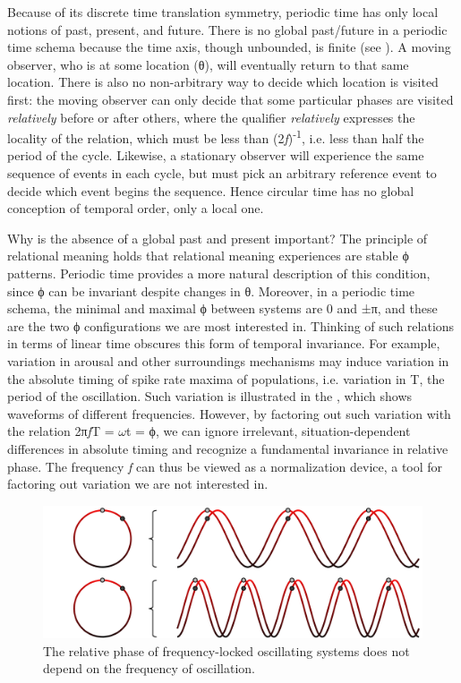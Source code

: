   Because of its discrete time translation symmetry, periodic time has only local notions of past, present, and future. There is no global past/future in a periodic time schema because the time axis, though unbounded, is finite (see {}). A moving observer, who is at some location (θ), will eventually return to that same location. There is also no non-arbitrary way to decide which location is visited first: the moving observer can only decide that some particular phases are visited \textit{relatively} before or after others, where the qualifier \textit{relatively} expresses the locality of the relation, which must be less than (2\textit{f})\textsuperscript{{}-1}, i.e. less than half the period of the cycle. Likewise, a stationary observer will experience the same sequence of events in each cycle, but must pick an arbitrary reference event to decide which event begins the sequence. Hence circular time has no global conception of temporal order, only a local one. 

  Why is the absence of a global past and present important? The principle of relational meaning holds that relational meaning experiences are stable ϕ patterns. Periodic time provides a more natural description of this condition, since ϕ can be invariant despite changes in θ. Moreover, in a periodic time schema, the minimal and maximal ϕ between systems are 0 and ±π, and these are the two ϕ configurations we are most interested in. Thinking of such relations in terms of linear time obscures this form of temporal invariance. For example, variation in arousal and other surroundings mechanisms may induce variation in the absolute timing of spike rate maxima of populations, i.e. variation in T, the period of the oscillation. Such variation is illustrated in the {}, which shows waveforms of different frequencies. However, by factoring out such variation with the relation 2π\textit{f}T = $\omega $t = ϕ, we can ignore irrelevant, situation-dependent differences in absolute timing and recognize a fundamental invariance in relative phase. The frequency \textit{f} can thus be viewed as a normalization device, a tool for factoring out variation we are not interested in.

  
\begin{figure}
\includegraphics[width=\textwidth]{figures/Tilsen-img48.png}
\caption{The relative phase of frequency-locked oscillating systems does not depend on the frequency of oscillation.}
\label{fig:3:20}
\end{figure}
 

